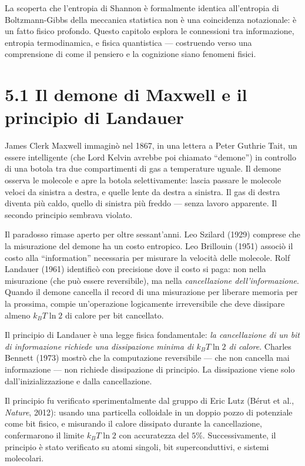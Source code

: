 \documentclass[11.5pt,a4paper,openany]{book}
\theoremstyle{remark}
\begin{document}
La scoperta che l'entropia di Shannon è formalmente identica all'entropia di Boltzmann-Gibbs della meccanica statistica non è una coincidenza notazionale: è un fatto fisico profondo. Questo capitolo esplora le connessioni tra informazione, entropia termodinamica, e fisica quantistica --- costruendo verso una comprensione di come il pensiero e la cognizione siano fenomeni fisici.

\section{5.1 Il demone di Maxwell e il principio di Landauer}

James Clerk Maxwell immaginò nel 1867, in una lettera a Peter Guthrie Tait, un essere intelligente (che Lord Kelvin avrebbe poi chiamato ``demone'') in controllo di una botola tra due compartimenti di gas a temperature uguale. Il demone osserva le molecole e apre la botola selettivamente: lascia passare le molecole veloci da sinistra a destra, e quelle lente da destra a sinistra. Il gas di destra diventa più caldo, quello di sinistra più freddo --- senza lavoro apparente. Il secondo principio sembrava violato.

Il paradosso rimase aperto per oltre sessant'anni. Leo Szilard (1929) comprese che la misurazione del demone ha un costo entropico. Leo Brillouin (1951) associò il costo alla ``information'' necessaria per misurare la velocità delle molecole. Rolf Landauer (1961) identificò con precisione dove il costo si paga: non nella misurazione (che può essere reversibile), ma nella \textit{cancellazione dell'informazione}. Quando il demone cancella il record di una misurazione per liberare memoria per la prossima, compie un'operazione logicamente irreversibile che deve dissipare almeno $k_B T \ln 2$ di calore per bit cancellato.

Il principio di Landauer è una legge fisica fondamentale: \textit{la cancellazione di un bit di informazione richiede una dissipazione minima di $k_B T \ln 2$ di calore}. Charles Bennett (1973) mostrò che la computazione reversibile --- che non cancella mai informazione --- non richiede dissipazione di principio. La dissipazione viene solo dall'inizializzazione e dalla cancellazione.

Il principio fu verificato sperimentalmente dal gruppo di Eric Lutz (Bérut et al., \textit{Nature}, 2012): usando una particella colloidale in un doppio pozzo di potenziale come bit fisico, e misurando il calore dissipato durante la cancellazione, confermarono il limite $k_B T \ln 2$ con accuratezza del $5\%$. Successivamente, il principio è stato verificato su atomi singoli, bit superconduttivi, e sistemi molecolari.
\end{document}
